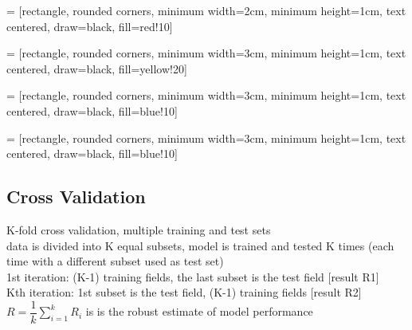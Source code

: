 \documentclass{article}
\begin{document}
\vspace{10mm}

 = [rectangle, rounded corners,
minimum width=2cm,
minimum height=1cm,
text centered,
draw=black,
fill=red!10]

 = [rectangle, rounded corners,
minimum width=3cm,
minimum height=1cm,
text centered,
draw=black,
fill=yellow!20]

 = [rectangle, rounded corners,
minimum width=3cm,
minimum height=1cm,
text centered,
draw=black,
fill=blue!10]

 = [rectangle, rounded corners,
minimum width=3cm,
minimum height=1cm,
text centered,
draw=black,
fill=blue!10]

\vspace{10mm}

\begin{center}
    \end{center}
\newpage
\subsection*{Cross Validation}
K-fold cross validation, multiple training and test sets \\
data is divided into K equal subsets, model is trained and tested K times (each time with a different subset used as test set)
\\

1st iteration:  (K-1) training fields, the last subset is the test field [result R1]\\
\hspace*{5mm}Kth iteration:  1st subset is the test field, (K-1) training fields [result R2] \\
\hspace*{5mm} $ R = \dfrac{1}{k} \sum_{i=1}^{k} R_i$ is is the robust estimate of model performance 
\end{document}
